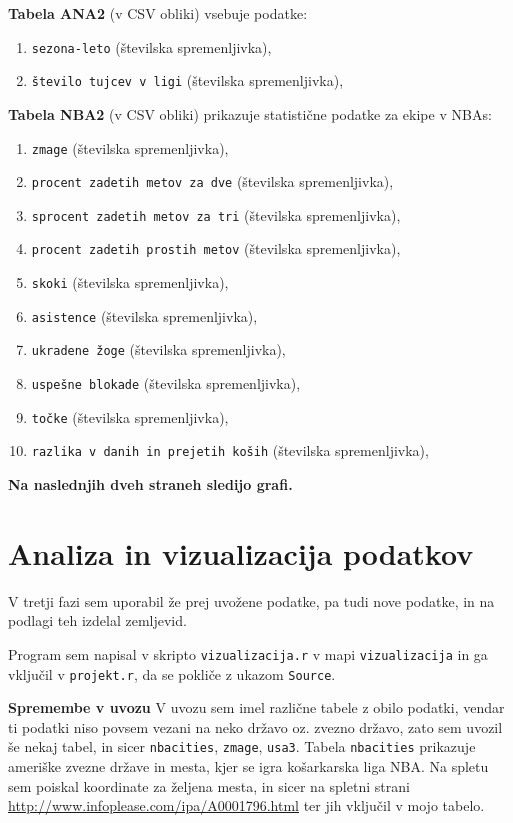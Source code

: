 \documentclass[11pt,a4paper]{article}
\begin{document}
\smallskip
\textbf{Tabela ANA2} (v CSV obliki) vsebuje podatke:
\begin{enumerate}
\item{\verb|sezona-leto| (številska spremenljivka),}
\item{\verb|število tujcev v ligi| (številska spremenljivka),}
\end{enumerate}
\smallskip


\textbf{Tabela NBA2} (v CSV obliki) prikazuje statistične podatke za ekipe v NBAs:

\begin{enumerate}
\item{\verb|zmage| (številska spremenljivka),}
\item{\verb|procent zadetih metov za dve| (številska spremenljivka),}
\item{\verb|sprocent zadetih metov za tri| (številska spremenljivka),}
\item{\verb|procent zadetih prostih metov| (številska spremenljivka),}
\item{\verb|skoki| (številska spremenljivka),}
\item{\verb|asistence| (številska spremenljivka),}
\item{\verb|ukradene žoge| (številska spremenljivka),}
\item{\verb|uspešne blokade| (številska spremenljivka),}
\item{\verb|točke| (številska spremenljivka),}
\item{\verb|razlika v danih in prejetih koših| (številska spremenljivka),}
\end{enumerate}
\smallskip

\textbf{Na naslednjih dveh straneh sledijo grafi.}





\section{Analiza in vizualizacija podatkov}

V tretji fazi sem uporabil že prej uvožene podatke, pa tudi nove podatke, in na podlagi teh izdelal zemljevid.
\smallskip

Program sem napisal v skripto \verb|vizualizacija.r| v mapi \verb|vizualizacija| in ga vključil v \verb|projekt.r|, da se pokliče z ukazom \verb|Source|.
\smallskip

\textbf{Spremembe v uvozu}
V uvozu sem imel različne tabele z obilo podatki, vendar ti podatki niso povsem vezani na neko državo oz. zvezno državo, zato sem uvozil še nekaj tabel, in sicer \verb|nbacities|, \verb|zmage|, \verb|usa3|. Tabela \verb|nbacities| prikazuje ameriške zvezne države in mesta, kjer se igra košarkarska liga NBA. Na spletu sem poiskal koordinate za željena mesta, in sicer na spletni strani \url{http://www.infoplease.com/ipa/A0001796.html} ter jih vključil v mojo tabelo.
\end{document}
